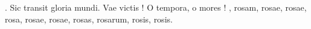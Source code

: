 \documentclass{article}
\begin{document}
\beginnumbering

\pstart
{}. Sic\resetlinenumannotation{} transit gloria mundi. Vae victis ! O tempora, o mores ! , rosam, rosae, rosae, rosa, rosae, rosae, rosas, rosarum, rosis, rosis.
\pend
\endnumbering
\end{document}
